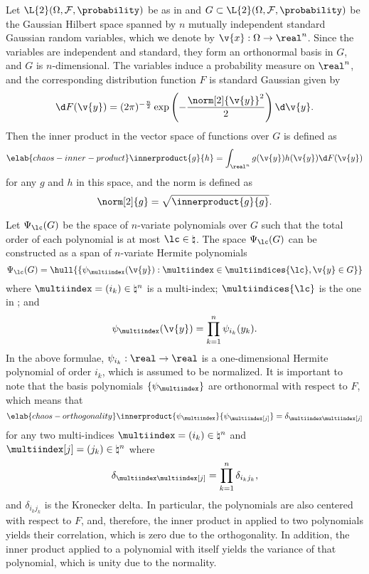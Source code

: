 Let $\L{2}(\Omega, \mathcal{F}, \probability)$ be as in
 and $G \subset \L{2}(\Omega, \mathcal{F},
\probability)$ be the Gaussian Hilbert space \cite{janson1997} spanned by $n$
mutually independent standard Gaussian random variables, which we denote by
$\v{x}: \Omega \to \real^n$. Since the variables are independent and standard,
they form an orthonormal basis in $G$, and $G$ is $n$-dimensional. The variables
induce a probability measure on $\real^n$, and the corresponding distribution
function $F$ is standard Gaussian given by
\[
  \d F(\v{y}) = (2 \pi)^{-\frac{n}{2}} \exp\left(-\frac{\norm[2]{\v{y}}^2}{2}\right) \d \v{y}.
\]
Then the inner product in the vector space of functions over $G$ is defined as
\begin{equation} \elab{chaos-inner-product}
  \innerproduct{g}{h} = \int_{\real^n} g(\v{y}) h(\v{y}) \d F(\v{y})
\end{equation}
for any $g$ and $h$ in this space, and the norm is defined as
\[
  \norm[2]{g} = \sqrt{\innerproduct{g}{g}}.
\]

Let $\Psi_\lc(G)$ be the space of $n$-variate polynomials over $G$ such that the
total order of each polynomial is at most $\lc \in \natural$. The space
$\Psi_\lc(G)$ can be constructed as a span of $n$-variate Hermite polynomials
\cite{eldred2008, maitre2010}
\[
  \Psi_\lc(G) = \hull{\left\{ \psi_{\multiindex}(\v{y}): \multiindex \in \multiindices{\lc}, \v{y} \in G \right\}}
\]
where $\multiindex = (i_k) \in \natural^n$ is a multi-index;
$\multiindices{\lc}$ is the one in ; and
\[
  \psi_{\multiindex}(\v{y}) = \prod_{k = 1}^n \psi_{i_k}(y_k).
\]
In the above formulae, $\psi_{i_k}: \real \to \real$ is a one-dimensional
Hermite polynomial of order $i_k$, which is assumed to be normalized. It is
important to note that the basis polynomials $\{ \psi_{\multiindex} \}$ are
orthonormal with respect to $F$, which means that
\begin{equation} \elab{chaos-orthogonality}
  \innerproduct{\psi_{\multiindex}}{\psi_{\multiindex[j]}} = \delta_{\multiindex \multiindex[j]}
\end{equation}
for any two multi-indices $\multiindex = (i_k) \in \natural^n$ and
$\multiindex[j] = (j_k) \in \natural^n$ where
\[
  \delta_{\multiindex \multiindex[j]} = \prod_{k = 1}^n \delta_{i_k j_k},
\]
and $\delta_{i_k j_k}$ is the Kronecker delta. In particular, the polynomials
are also centered with respect to $F$, and, therefore, the inner product in
 applied to two polynomials yields their correlation,
which is zero due to the orthogonality. In addition, the inner product applied
to a polynomial with itself yields the variance of that polynomial, which is
unity due to the normality.

